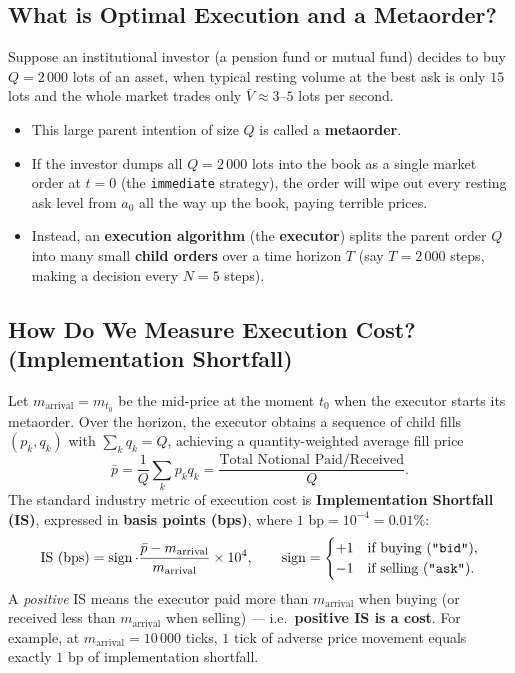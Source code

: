 \documentclass[11pt,a4paper]{article}
\newcommand{\code}[1]{\texttt{#1}}
\newcommand{\sign}{\operatorname{sign}}
\begin{document}
\subsection{What is Optimal Execution and a Metaorder?}

Suppose an institutional investor (a pension fund or mutual fund) decides to buy $Q = 2\,000$ lots of
an asset, when typical resting volume at the best ask is only $15$ lots and the whole market trades
only $\bar V \approx 3$--$5$ lots per second.
\begin{itemize}[nosep]
\item This large parent intention of size $Q$ is called a \textbf{metaorder}.
\item If the investor dumps all $Q = 2\,000$ lots into the book as a single market order at $t=0$
  (the \code{immediate} strategy), the order will wipe out every resting ask level from $a_0$ all the
  way up the book, paying terrible prices.
\item Instead, an \textbf{execution algorithm} (the \textbf{executor}) splits the parent order $Q$ into
  many small \textbf{child orders} over a time horizon $T$ (say $T = 2\,000$ steps, making a decision
  every $N = 5$ steps).
\end{itemize}

\subsection{How Do We Measure Execution Cost? (Implementation Shortfall)}

Let $m_{\text{arrival}} = m_{t_0}$ be the mid-price at the moment $t_0$ when the executor starts its
metaorder. Over the horizon, the executor obtains a sequence of child fills $(p_k, q_k)$ with
$\sum_k q_k = Q$, achieving a quantity-weighted average fill price
\begin{equation}
  \bar p = \frac{1}{Q}\sum_{k} p_k q_k = \frac{\text{Total Notional Paid/Received}}{Q}.
\end{equation}
The standard industry metric of execution cost is \textbf{Implementation Shortfall (IS)}, expressed in
\textbf{basis points (bps)}, where $1\text{ bp} = 10^{-4} = 0.01\%$:
\begin{equation}
  \label{eq:is_def}
  \text{IS (bps)} = \sign \cdot \frac{\bar p - m_{\text{arrival}}}{m_{\text{arrival}}} \times 10^4,
  \qquad \sign = \begin{cases} +1 & \text{if buying (\code{"bid"})}, \\ -1 & \text{if selling (\code{"ask"})}. \end{cases}
\end{equation}
A \emph{positive} IS means the executor paid more than $m_{\text{arrival}}$ when buying (or received
less than $m_{\text{arrival}}$ when selling) --- i.e.\ \textbf{positive IS is a cost}. For example, at
$m_{\text{arrival}} = 10\,000$ ticks, $1\text{ tick}$ of adverse price movement equals exactly
$1\text{ bp}$ of implementation shortfall.
\end{document}
